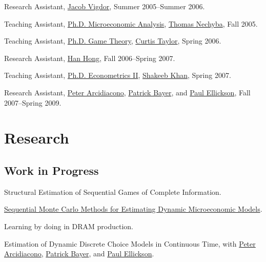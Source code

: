 \documentclass[letterpaper]{article}
\renewenvironment{itemize}{
  \begin{list}{}{
    \setlength{\leftmargin}{1em}
  }
}{
  \end{list}
}
\begin{document}
\begin{itemize}
\item Research Assistant,
  \href{http://trinity.aas.duke.edu/~jvigdor/}{Jacob Vigdor},
  Summer 2005--Summer 2006.
\item Teaching Assistant,
  \href{http://jblevins.org/courses/econ301f05}{Ph.D. Microeconomic Analysis},
  \href{http://www.econ.duke.edu/~nechyba/}{Thomas Nechyba},
  Fall 2005.
\item Teaching Assistant,
  \href{http://jblevins.org/courses/econ302s06}{Ph.D. Game Theory},
  \href{http://www.duke.edu/~crtaylor/}{Curtis Taylor},
  Spring 2006.
\item Research Assistant,
  \href{http://www.stanford.edu/~doubleh/}{Han Hong},
  Fall 2006--Spring 2007.
\item Teaching Assistant,
  \href{http://jblevins.org/courses/econ342s07}{Ph.D. Econometrics II},
  \href{http://www.econ.duke.edu/~shakeebk/}{Shakeeb Khan},
  Spring 2007.
\item Research Assistant,
  \href{http://www.econ.duke.edu/~psarcidi/}{Peter Arcidiacono},
  \href{http://www.econ.duke.edu/~pb29/}{Patrick Bayer}, and
  \href{http://www.econ.duke.edu/~paule/}{Paul Ellickson},
  Fall 2007--Spring 2009.
\end{itemize}


\section*{Research}

\subsection*{Work in Progress}

\begin{itemize}
\item Structural Estimation of Sequential Games of Complete Information.
\item \href{http://jblevins.org/research/smcdmm}{Sequential Monte Carlo
    Methods for Estimating Dynamic Microeconomic Models}.
\item Learning by doing in DRAM production.
\item Estimation of Dynamic Discrete Choice Models in Continuous
  Time, with
  \href{http://www.econ.duke.edu/~psarcidi/}{Peter Arcidiacono},
  \href{http://www.econ.duke.edu/~pb29/}{Patrick Bayer}, and
  \href{http://www.econ.duke.edu/~paule/}{Paul Ellickson}.
\end{itemize}
\end{document}
